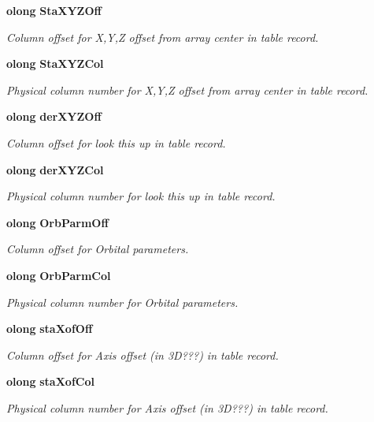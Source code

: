 \begin{CompactItemize}
{\bf olong} {\bf Sta\-XYZOff}
\begin{CompactList}\small\item\em Column offset for X,Y,Z offset from array center in table record. \item\end{CompactList}\item 
{\bf olong} {\bf Sta\-XYZCol}
\begin{CompactList}\small\item\em Physical column number for X,Y,Z offset from array center in table record. \item\end{CompactList}\item 
{\bf olong} {\bf der\-XYZOff}
\begin{CompactList}\small\item\em Column offset for look this up in table record. \item\end{CompactList}\item 
{\bf olong} {\bf der\-XYZCol}
\begin{CompactList}\small\item\em Physical column number for look this up in table record. \item\end{CompactList}\item 
{\bf olong} {\bf Orb\-Parm\-Off}
\begin{CompactList}\small\item\em Column offset for Orbital parameters. \item\end{CompactList}\item 
{\bf olong} {\bf Orb\-Parm\-Col}
\begin{CompactList}\small\item\em Physical column number for Orbital parameters. \item\end{CompactList}\item 
{\bf olong} {\bf sta\-Xof\-Off}
\begin{CompactList}\small\item\em Column offset for Axis offset (in 3D???) in table record. \item\end{CompactList}\item 
{\bf olong} {\bf sta\-Xof\-Col}
\begin{CompactList}\small\item\em Physical column number for Axis offset (in 3D???) in table record. \item\end{CompactList}\end{CompactItemize}


